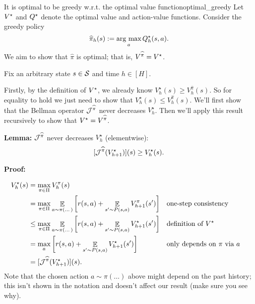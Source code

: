 \documentclass[\main/main]{subfiles}
\begin{document}
\begin{theorem}{It is optimal to be greedy w.r.t. the optimal value function}{optimal_greedy}
    Let $\Vopt$ and $\Qopt$ denote the optimal value and action-value functions. Consider the greedy policy
    \[
        \hat \pi_h(s) := \argmax_a Q_h^{\star}(s, a).
    \]
    We aim to show that $\hat \pi$ is optimal; that is, $V^{\hat \pi} = \Vopt$.

    Fix an arbitrary state $s \in \S$ and time $h \in [H]$.

    Firstly, by the definition of $\Vopt$, we already know $V_h^{\star}(s) \ge V_h^{\hat \pi}(s)$. So for equality to hold we just need to show that $V_h^{\star}(s) \le V_h^{\hat \pi}(s)$. We'll first show that the Bellman operator $\bop^{\hat \pi}$ never decreases $V_h^{\star}$. Then we'll apply this result recursively to show that $\Vopt = V^{\hat \pi}$.
    
    \textbf{Lemma:} $\bop^{\hat \pi}$ never decreases $V_h^{\star}$ (elementwise):
    \[
        [\bop^{\hat \pi} (V_{h+1}^{\star})](s) \ge V_h^{\star}(s).
    \]
    
    \textbf{Proof:}
    
    \begin{align*}
    V_h^{\star}(s) &= \max_{\pi \in \Pi} V_h^{\pi}(s) \\
    &= \max_{\pi \in \Pi} \mathop{\mathbb{E}}_{a \sim \pi(\dots)}\left[r(s, a) + \mathop{\mathbb{E}}_{s' \sim P(s, a)} V_{h+1}^\pi(s') \right] && \text{one-step consistency} \\
    &\le \max_{\pi \in \Pi} \mathop{\mathbb{E}}_{a \sim \pi(\dots)}\left[r(s, a) + \mathop{\mathbb{E}}_{s' \sim P(s, a)} V_{h+1}^{\star}(s') \right] && \text{definition of } \Vopt \\
    &= \max_{a} \left[ r(s, a) + \mathop{\mathbb{E}}_{s' \sim P(s, a)} V_{h+1}^{\star}(s') \right] && \text{only depends on } \pi \text{ via } a \\
    &= [\bop^{\hat \pi}(V_{h+1}^{\star})](s).
    \end{align*}
    Note that the chosen action $a \sim \pi(\dots)$ above might depend on the past history; this isn't shown in the notation and doesn't affect our result (make sure you see why).
    

\end{theorem}
\end{document}
